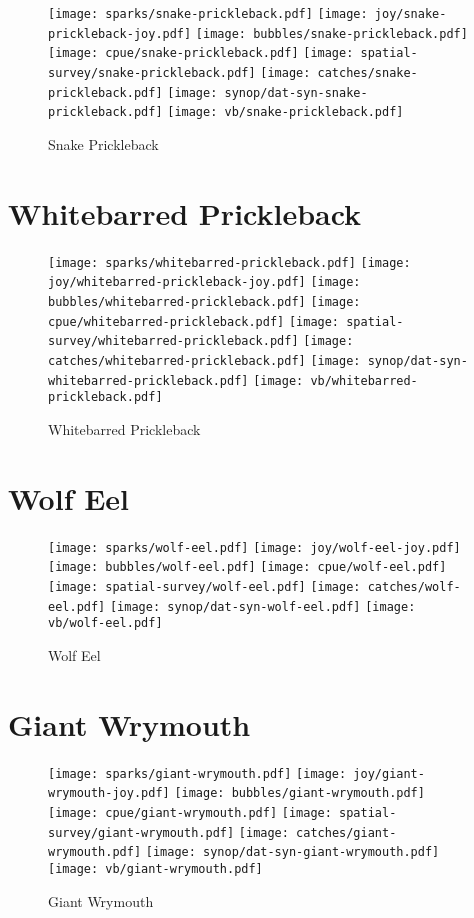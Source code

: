 \begin{figure}[htbp]
\centering
\texttt{[image: sparks/snake-prickleback.pdf]}
\texttt{[image: joy/snake-prickleback-joy.pdf]}
\texttt{[image: bubbles/snake-prickleback.pdf]}
\texttt{[image: cpue/snake-prickleback.pdf]}
\texttt{[image: spatial-survey/snake-prickleback.pdf]}
\texttt{[image: catches/snake-prickleback.pdf]}
\texttt{[image: synop/dat-syn-snake-prickleback.pdf]}
\texttt{[image: vb/snake-prickleback.pdf]}
\caption{Snake Prickleback}
\end{figure}
\clearpage
\section{Whitebarred Prickleback}

\begin{figure}[htbp]
\centering
\texttt{[image: sparks/whitebarred-prickleback.pdf]}
\texttt{[image: joy/whitebarred-prickleback-joy.pdf]}
\texttt{[image: bubbles/whitebarred-prickleback.pdf]}
\texttt{[image: cpue/whitebarred-prickleback.pdf]}
\texttt{[image: spatial-survey/whitebarred-prickleback.pdf]}
\texttt{[image: catches/whitebarred-prickleback.pdf]}
\texttt{[image: synop/dat-syn-whitebarred-prickleback.pdf]}
\texttt{[image: vb/whitebarred-prickleback.pdf]}
\caption{Whitebarred Prickleback}
\end{figure}
\clearpage
\section{Wolf Eel}

\begin{figure}[htbp]
\centering
\texttt{[image: sparks/wolf-eel.pdf]}
\texttt{[image: joy/wolf-eel-joy.pdf]}
\texttt{[image: bubbles/wolf-eel.pdf]}
\texttt{[image: cpue/wolf-eel.pdf]}
\texttt{[image: spatial-survey/wolf-eel.pdf]}
\texttt{[image: catches/wolf-eel.pdf]}
\texttt{[image: synop/dat-syn-wolf-eel.pdf]}
\texttt{[image: vb/wolf-eel.pdf]}
\caption{Wolf Eel}
\end{figure}
\clearpage
\section{Giant Wrymouth}

\begin{figure}[htbp]
\centering
\texttt{[image: sparks/giant-wrymouth.pdf]}
\texttt{[image: joy/giant-wrymouth-joy.pdf]}
\texttt{[image: bubbles/giant-wrymouth.pdf]}
\texttt{[image: cpue/giant-wrymouth.pdf]}
\texttt{[image: spatial-survey/giant-wrymouth.pdf]}
\texttt{[image: catches/giant-wrymouth.pdf]}
\texttt{[image: synop/dat-syn-giant-wrymouth.pdf]}
\texttt{[image: vb/giant-wrymouth.pdf]}
\caption{Giant Wrymouth}
\end{figure}
\clearpage
